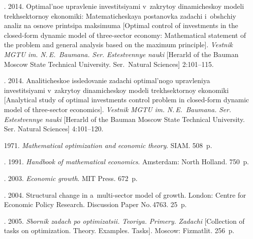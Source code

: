   \begin{multicols}{2}

\renewcommand{\bibname}{\protect\rmfamily References}

{\small\frenchspacing
 {%
 \begin{thebibliography}{99}


. 2014.  
Optimal'noe upravlenie investitsiyami v~zakrytoy dinamicheskoy modeli trekhsektornoy 
ekonomiki: Matematicheskaya postanovka zadachi i~obshchiy analiz na osnove printsipa 
maksimuma   [Optimal control of investments in the closed-form dynamic model of 
three-sector economy: Mathematical statement of the problem and general analysis 
based on the maximum principle]. \textit{Vestnik MGTU im. N.\,E.~Baumana. Ser. 
Estestvennye nauki} [Herarld of the Bauman Moscow State Technical University. Ser.\
 Natural Sciences] 2:101--115.
 
.  2014. 
Analiticheskoe issledovanie zadachi optimal'nogo upravleniya investi\-tsi\-yami 
v~zakrytoy dinamicheskoy modeli trekhsektornoy ekonomiki 
[Analytical study of optimal investments control problem in closed-form dynamic 
model of three-sector economics]. \textit{Vestnik MGTU im. N.\,E.~Baumana. Ser. 
Estestvennye nauki} [Herarld of the Bauman Moscow State Technical University. 
Ser. Natural Sciences] 4:101--120.
 

 1971. \textit{Mathematical optimization and economic theory}. SIAM. 508~p.

. 1991. 
\textit{Handbook of mathematical economics}. Amsterdam: North Holland. 750~p.


. 2003. 
\textit{ Economic growth}. MIT Press. 672~p.


. 2004. Structural change in a~multi-sector
model of growth. London: Centre for Economic Policy Research.
 Discussion Paper No.\,4763.  25~p.



. 
2005. \textit{Sbornik zadach po optimizatsii. Teoriya. Primery. Zadachi} 
[Collection of tasks on optimization. Theory. Examples. Tasks].
 Moscow: Fizmatlit. 256~p.
 

\end{thebibliography}}}
\end{multicols}
